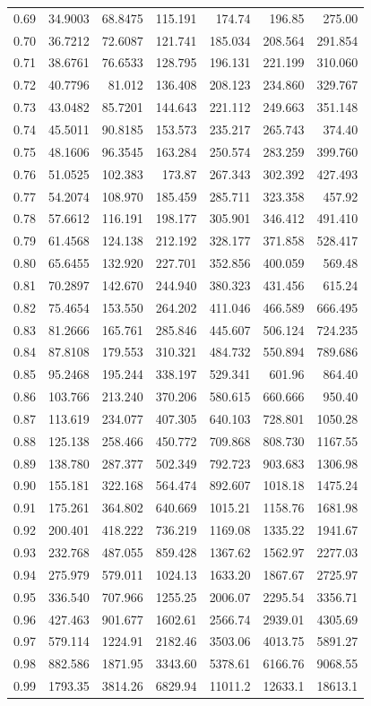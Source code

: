 \begin{longtable}{@{}lrrrrrr@{}}
0.69 & 34.9003 & 68.8475 & 115.191 & 174.74 & 196.85 & 275.00\\
0.70 & 36.7212 & 72.6087 & 121.741 & 185.034 & 208.564 & 291.854\\
0.71 & 38.6761 & 76.6533 & 128.795 & 196.131 & 221.199 & 310.060\\
0.72 & 40.7796 & 81.012 & 136.408 & 208.123 & 234.860 & 329.767\\
0.73 & 43.0482 & 85.7201 & 144.643 & 221.112 & 249.663 & 351.148\\
0.74 & 45.5011 & 90.8185 & 153.573 & 235.217 & 265.743 & 374.40\\
0.75 & 48.1606 & 96.3545 & 163.284 & 250.574 & 283.259 & 399.760\\
0.76 & 51.0525 & 102.383 & 173.87 & 267.343 & 302.392 & 427.493\\
0.77 & 54.2074 & 108.970 & 185.459 & 285.711 & 323.358 & 457.92\\
0.78 & 57.6612 & 116.191 & 198.177 & 305.901 & 346.412 & 491.410\\
0.79 & 61.4568 & 124.138 & 212.192 & 328.177 & 371.858 & 528.417\\
0.80 & 65.6455 & 132.920 & 227.701 & 352.856 & 400.059 & 569.48\\
0.81 & 70.2897 & 142.670 & 244.940 & 380.323 & 431.456 & 615.24\\
0.82 & 75.4654 & 153.550 & 264.202 & 411.046 & 466.589 & 666.495\\
0.83 & 81.2666 & 165.761 & 285.846 & 445.607 & 506.124 & 724.235\\
0.84 & 87.8108 & 179.553 & 310.321 & 484.732 & 550.894 & 789.686\\
0.85 & 95.2468 & 195.244 & 338.197 & 529.341 & 601.96 & 864.40\\
0.86 & 103.766 & 213.240 & 370.206 & 580.615 & 660.666 & 950.40\\
0.87 & 113.619 & 234.077 & 407.305 & 640.103 & 728.801 & 1050.28\\
0.88 & 125.138 & 258.466 & 450.772 & 709.868 & 808.730 & 1167.55\\
0.89 & 138.780 & 287.377 & 502.349 & 792.723 & 903.683 & 1306.98\\
0.90 & 155.181 & 322.168 & 564.474 & 892.607 & 1018.18 & 1475.24\\
0.91 & 175.261 & 364.802 & 640.669 & 1015.21 & 1158.76 & 1681.98\\
0.92 & 200.401 & 418.222 & 736.219 & 1169.08 & 1335.22 & 1941.67\\
0.93 & 232.768 & 487.055 & 859.428 & 1367.62 & 1562.97 & 2277.03\\
0.94 & 275.979 & 579.011 & 1024.13 & 1633.20 & 1867.67 & 2725.97\\
0.95 & 336.540 & 707.966 & 1255.25 & 2006.07 & 2295.54 & 3356.71\\
0.96 & 427.463 & 901.677 & 1602.61 & 2566.74 & 2939.01 & 4305.69\\
0.97 & 579.114 & 1224.91 & 2182.46 & 3503.06 & 4013.75 & 5891.27\\
0.98 & 882.586 & 1871.95 & 3343.60 & 5378.61 & 6166.76 & 9068.55\\
0.99 & 1793.35 & 3814.26 & 6829.94 & 11011.2 & 12633.1 & 18613.1\\
\end{longtable}
